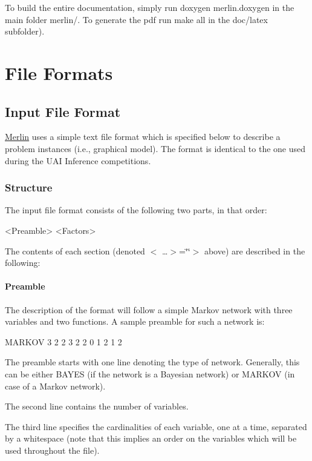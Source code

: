 To build the entire documentation, simply run {\ttfamily doxygen merlin.\+doxygen} in the main folder {\ttfamily merlin/}. To generate the pdf run {\ttfamily make all} in the {\ttfamily doc/latex} subfolder).

\section*{File Formats}

\subsection*{Input File Format}

\hyperlink{classMerlin}{Merlin} uses a simple text file format which is specified below to describe a problem instances (i.\+e., graphical model). The format is identical to the one used during the U\+A\+I Inference competitions.

\subsubsection*{Structure}

The input file format consists of the following two parts, in that order\+: \begin{DoxyVerb}    <Preamble>
    <Factors>
\end{DoxyVerb}


The contents of each section (denoted $<$ …$>$=\char`\"{}\char`\"{}$>$ above) are described in the following\+:

\paragraph*{Preamble}

The description of the format will follow a simple Markov network with three variables and two functions. A sample preamble for such a network is\+: \begin{DoxyVerb}    MARKOV
    3
    2 2 3
    2
    2 0 1
    2 1 2
\end{DoxyVerb}


The preamble starts with one line denoting the type of network. Generally, this can be either B\+A\+Y\+E\+S (if the network is a Bayesian network) or M\+A\+R\+K\+O\+V (in case of a Markov network).

The second line contains the number of variables.

The third line specifies the cardinalities of each variable, one at a time, separated by a whitespace (note that this implies an order on the variables which will be used throughout the file).

